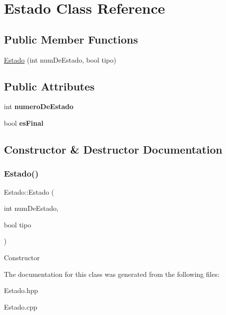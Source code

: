 \hypertarget{class_estado}{}\section{Estado Class Reference}
\label{class_estado}
\subsection*{Public Member Functions}
\begin{DoxyCompactItemize}
\item 
\hyperlink{class_estado_a916fc52f64ed19c1ea86acbcc9a83b4f}{Estado} (int num\+De\+Estado, bool tipo)
\end{DoxyCompactItemize}
\subsection*{Public Attributes}
\begin{DoxyCompactItemize}
\item 
\mbox{\label{class_estado_af32184e41b6771d7855b7e4a7c0b1758}} 
int {\bfseries numero\+De\+Estado}
\item 
\mbox{\label{class_estado_aae3487981a5e4395fc6156ef5fc35376}} 
bool {\bfseries es\+Final}
\end{DoxyCompactItemize}


\subsection{Constructor \& Destructor Documentation}
\mbox{\label{class_estado_a916fc52f64ed19c1ea86acbcc9a83b4f}} 
\subsubsection{\texorpdfstring{Estado()}{Estado()}}
{\footnotesize\ttfamily Estado\+::\+Estado (\begin{DoxyParamCaption}\item[{int}]{num\+De\+Estado,  }\item[{bool}]{tipo }\end{DoxyParamCaption})}

Constructor 

The documentation for this class was generated from the following files\+:\begin{DoxyCompactItemize}
\item 
Estado.\+hpp\item 
Estado.\+cpp\end{DoxyCompactItemize}
